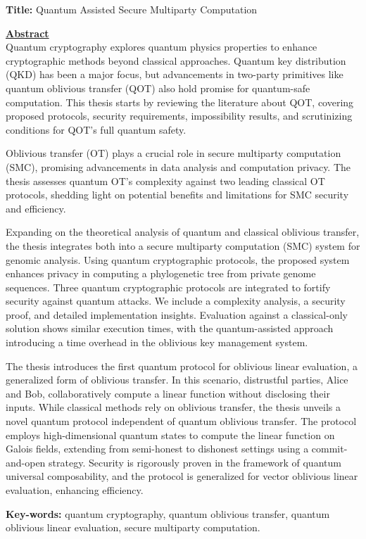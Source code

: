 \documentclass[11pt]{report}
\begin{document}
\noindent \textbf{Title:} Quantum Assisted Secure Multiparty Computation

\vspace{2\baselineskip}

\underline{\textbf{Abstract}}\\
\noindent Quantum cryptography explores quantum physics properties to enhance cryptographic methods beyond classical approaches. Quantum key distribution (QKD) has been a major focus, but advancements in two-party primitives like quantum oblivious transfer (QOT) also hold promise for quantum-safe computation. This thesis starts by reviewing the literature about QOT, covering proposed protocols, security requirements, impossibility results, and scrutinizing conditions for QOT's full quantum safety.

Oblivious transfer (OT) plays a crucial role in secure multiparty computation (SMC), promising advancements in data analysis and computation privacy. The thesis assesses quantum OT's complexity against two leading classical OT protocols, shedding light on potential benefits and limitations for SMC security and efficiency.

Expanding on the theoretical analysis of quantum and classical oblivious transfer, the thesis integrates both into a secure multiparty computation (SMC) system for genomic analysis. Using quantum cryptographic protocols, the proposed system enhances privacy in computing a phylogenetic tree from private genome sequences. Three quantum cryptographic protocols are integrated to fortify security against quantum attacks. We include a complexity analysis, a security proof, and detailed implementation insights. Evaluation against a classical-only solution shows similar execution times, with the quantum-assisted approach introducing a time overhead in the oblivious key management system.

The thesis introduces the first quantum protocol for oblivious linear evaluation, a generalized form of oblivious transfer. In this scenario, distrustful parties, Alice and Bob, collaboratively compute a linear function without disclosing their inputs. While classical methods rely on oblivious transfer, the thesis unveils a novel quantum protocol independent of quantum oblivious transfer. The protocol employs high-dimensional quantum states to compute the linear function on Galois fields, extending from semi-honest to dishonest settings using a commit-and-open strategy. Security is rigorously proven in the framework of quantum universal composability, and the protocol is generalized for vector oblivious linear evaluation, enhancing efficiency.

\vfill

\begin{flushleft}
\textbf{Key-words:} quantum cryptography, quantum oblivious transfer, quantum oblivious
linear evaluation, secure multiparty computation.
\end{flushleft}
\end{document}
